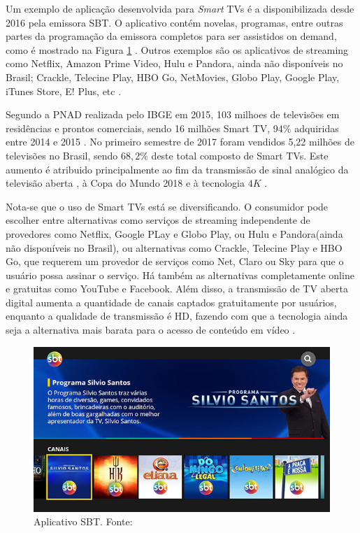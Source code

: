 Um exemplo de aplicação desenvolvida para \emph{Smart} TVs é a disponibilizada desde 2016 pela emissora SBT. O aplicativo contém novelas, programas, entre outras partes da programação da emissora completos para ser assistidos on demand, como é mostrado na Figura \ref{fig:sbt_app} \cite{sbt:tvconectada}. Outros exemplos são os aplicativos de streaming como Netflix, Amazon Prime Video, Hulu e Pandora, ainda não disponíveis no Brasil; Crackle, Telecine Play, HBO Go, NetMovies, Globo Play, Google Play, iTunes Store, E! Plus, etc \cite{canaltech:streaming}.

Segundo a PNAD realizada pelo IBGE em 2015, 103 milhoes de televisões em residências e prontos comerciais, sendo 16 milhões Smart TV, 94$\%$ adquiridas entre 2014 e 2015 \cite{pnad2015}. No primeiro semestre de 2017 foram vendidos 5,22 milhões de televisões no Brasil, sendo $68,2\%$ deste total composto de Smart TVs. Este aumento é atribuido principalmente ao fim da transmissão de sinal analógico da televisão aberta \cite{leiajabuscasmart}, à Copa do Mundo 2018 e à tecnologia $4K$ \cite{correiopnad}.

Nota-se que o uso de Smart TVs está se diversificando. O consumidor pode escolher entre alternativas como serviços de streaming independente de provedores como Netflix, Google PLay e Globo Play, ou Hulu e Pandora(ainda não disponíveis no Brasil), ou alternativas como Crackle, Telecine Play e HBO Go, que requerem um provedor de serviços como Net, Claro ou Sky para que o usuário possa assinar o serviço. Há também as alternativas completamente online e gratuitas como YouTube e Facebook. Além disso, a transmissão de TV aberta digital aumenta a quantidade de canais captados gratuitamente por usuários, enquanto a qualidade de transmissão é HD, fazendo com que a tecnologia ainda seja a alternativa mais barata para o acesso de conteúdo em vídeo \cite{estadao:explosaovideosonline} \cite{tomsguid:everythingsmart}.

\begin{figure}[h]
	\includegraphics[width=\textwidth]{img/sbt_app.jpg}
	\caption{Aplicativo SBT. Fonte: \cite{sbt:tvconectada}}
	\label{fig:sbt_app}
\end{figure}
